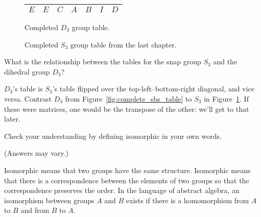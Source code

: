 \documentclass[../key.tex]{subfiles}
\begin{document}
\begin{figure}[h]
\begin{center}
\begin{minipage}[b]{0.45\textwidth}
\begin{tabular}{c|cccccc}
				$E$ & $E$ & $C$ & $A$ & $B$ & $I$ & $D$ \\ \hline
			\end{tabular}
			\vspace*{0.5\baselineskip}
		\end{minipage}
	\end{center}
	\vspace*{-2\baselineskip}
	\begin{center}
		\begin{minipage}[t]{0.45\textwidth}
			\caption{Completed $D_3$ group table.}
			\label{fig:complete_sbs_table}
		\end{minipage}
		\hfill
		\begin{minipage}[t]{0.45\textwidth}
			\caption{Completed $S_3$ group table from the last chapter.}
			\label{fig:complete_sts_table}
		\end{minipage}
	\end{center}
	\vspace*{-2\baselineskip}
\end{figure}

\begin{outer_problem}
\item What is the relationship between the tables for the snap group $S_3$ and the dihedral group $D_3$?
\end{outer_problem}

\noindent$D_3$'s table is $S_3$'s table flipped over the top-left--bottom-right diagonal, and vice versa. Contrast $D_3$ from Figure~\ref{fig:complete_sbs_table} to $S_3$ in Figure~\ref{fig:complete_sts_table}. If these were matrices, one would be the transpose of the other: we'll get to that later.

\begin{outer_problem}
\item Check your understanding by defining isomorphic in your own words.
\end{outer_problem}

\noindent (Answers may vary.)

Isomorphic means that two groups have the same structure.
Isomorphic means that there is a correspondence between the elements of two groups so that the correspondence preserves the order.
In the language of abstract algebra, an isomorphism between groups $A$ and $B$ exists if there is a homomorphism from $A$ to $B$ and from $B$ to $A$.
\end{document}
